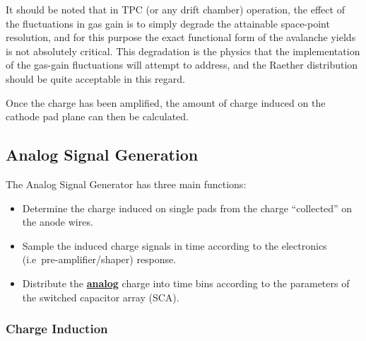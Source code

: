 \documentclass[twoside]{article}
\begin{document}
It should be noted that in TPC (or any drift chamber) operation,
the effect of the fluctuations in gas gain is to simply degrade the
attainable space-point resolution, and for this purpose the exact
functional form of the avalanche yields is not absolutely critical.
This degradation is the physics that the implementation of the gas-gain
fluctuations will attempt to address, and the Raether distribution should
be quite acceptable in this regard.

Once the charge has been amplified, the amount of charge induced on
the cathode pad plane can then be calculated.

\subsection{Analog Signal Generation}

The Analog Signal Generator has three main functions:
\begin{itemize}
   \item Determine the charge induced on single pads from the charge
     ``collected'' on the anode wires.
   \item Sample the induced charge signals in time according to the
     electronics (i.e~pre-amplifier/shaper) response.
   \item Distribute the \underline{\bf analog} charge into time bins
     according to the parameters of the switched capacitor array (SCA).
   \end{itemize}

\subsubsection{Charge Induction}
\end{document}

